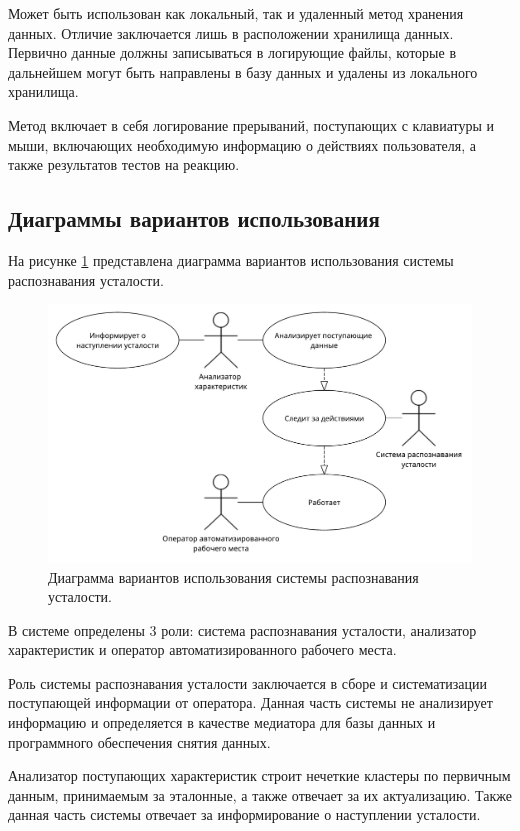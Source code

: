 Может быть использован как локальный, так и удаленный метод хранения данных. Отличие заключается лишь в расположении хранилища данных. Первично данные должны записываться в логирующие файлы, которые в дальнейшем могут быть направлены в базу данных и удалены из локального хранилища.

Метод включает в себя логирование прерываний, поступающих с клавиатуры и мыши, включающих необходимую информацию о действиях пользователя, а также результатов тестов на реакцию.

\subsection{Диаграммы вариантов использования}
На рисунке \ref{fig:useCase} представлена диаграмма вариантов использования системы распознавания усталости.
\begin{figure}[H]
	\centering
	\includegraphics[width=\textwidth]{img/useCaseDiagram.pdf}
	\caption{Диаграмма вариантов использования системы распознавания усталости.}
	\label{fig:useCase}
\end{figure}

В системе определены 3 роли: система распознавания усталости, анализатор характеристик и оператор автоматизированного рабочего места.

Роль системы распознавания усталости заключается в сборе и систематизации поступающей информации от оператора. Данная часть системы не анализирует информацию и определяется в качестве медиатора для базы данных и программного обеспечения снятия данных.

Анализатор поступающих характеристик строит нечеткие кластеры по первичным данным, принимаемым за эталонные, а также отвечает за их актуализацию. Также данная часть системы отвечает за информирование о наступлении усталости.

